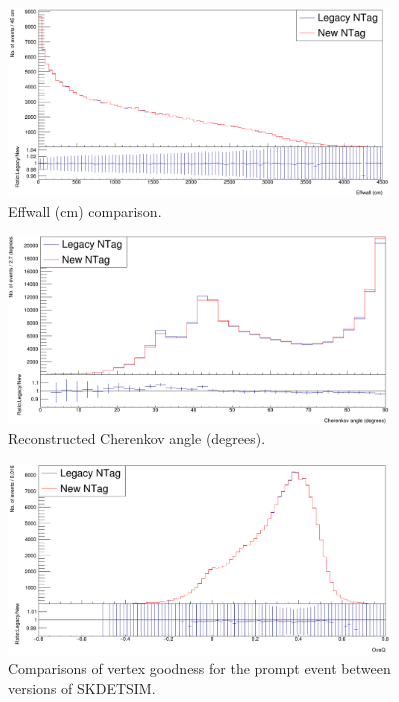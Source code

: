 \begin{figure}
    \centering
    \includegraphics[width=0.9\textwidth]{Figures/effwall_recon_compare.PNG}
    \caption{Effwall (cm) comparison.}
    \label{fig:effwall_recon_compare}

\end{figure}

\begin{figure}
    \centering
    \includegraphics[width=0.9\textwidth]{Figures/angle_recon_compare.PNG}
    \caption{Reconstructed Cherenkov angle (degrees).}
    \label{fig:angle_recon_compare}

\end{figure}

\begin{figure}
    \centering
    \includegraphics[width=0.9\textwidth]{Figures/ovaq_recon_compare.PNG}
    \caption{Comparisons of vertex goodness for the prompt event between versions of SKDETSIM.}
    \label{fig:ovaq_recon_compare}

\end{figure}

